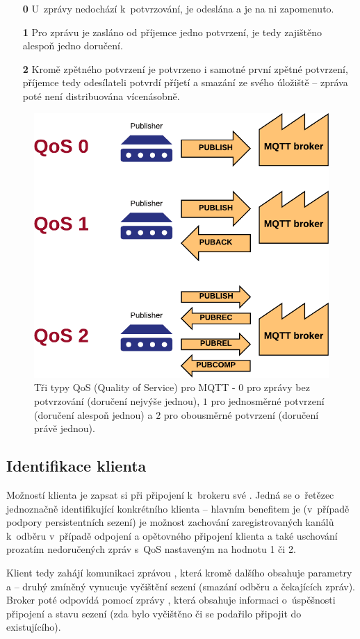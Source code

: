 \begin{enumerate}
    \item[\textbf{0}] U~zprávy nedochází k~potvrzování, je odeslána a je na ni zapomenuto.
    \item[\textbf{1}] Pro zprávu je zasláno od příjemce jedno potvrzení, je tedy zajištěno alespoň jedno doručení.
    \item[\textbf{2}] Kromě zpětného potvrzení je potvrzeno i samotné první zpětné potvrzení, příjemce tedy
    odesílateli potvrdí příjetí a smazání ze svého úložiště -- zpráva poté není distribuována vícenásobně.
\end{enumerate}

\begin{figure}
    \centering
    \includegraphics[width=.5\textwidth]{figures/mqtt-qos.png}
    \caption{Tři typy QoS (Quality of Service) pro MQTT - $0$ pro zprávy bez potvrzování (doručení nejvýše jednou),
    $1$ pro jednosměrné potvrzení (doručení alespoň jednou) a
    $2$ pro obousměrné potvrzení (doručení právě jednou).}
    \label{fig:mqtt-qos}
\end{figure}

\subsection{Identifikace klienta }\label{subsec:identifikace-klienta-client-id}
Možností klienta je zapsat si při připojení k~brokeru své .
Jedná se o~řetězec jednoznačně identifikující konkrétního klienta -- hlavním benefitem je (v~případě podpory
persistentních sezení) je možnost zachování zaregistrovaných kanálů k~odběru v~případě odpojení a
opětovného připojení klienta a také uschování prozatím nedoručených zpráv s~QoS nastaveným na hodnotu 1 či 2.

Klient tedy zahájí komunikaci zprávou , která kromě dalšího obsahuje parametry  a  -- druhý zmíněný vynucuje vyčištění sezení (smazání odběru a čekajících zpráv).
Broker poté odpovídá pomocí zprávy , která obsahuje informaci o~úspěšnosti připojení a stavu sezení (zda
bylo vyčištěno či se podařilo připojit do existujícího).

